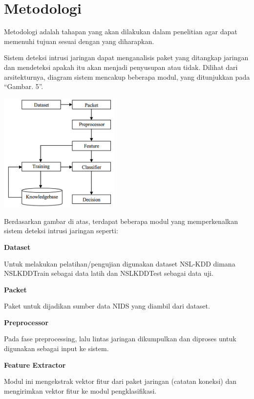 \documentclass[conference]{IEEEtran}
\begin{document}
\section{Metodologi}

Metodologi adalah tahapan yang akan dilakukan dalam penelitian agar dapat memenuhi tujuan sesuai dengan yang diharapkan.

Sistem deteksi intrusi jaringan dapat menganalisis paket yang ditangkap jaringan dan mendeteksi apakah itu akan menjadi penyusupan atau tidak.
Dilihat dari arsitekturnya, diagram sistem mencakup beberapa modul, yang ditunjukkan pada ``Gambar. 5''.

\noindent \begin{minipage}{\linewidth}
\centerline{\includegraphics[width=60mm]{Gambar/Metodologi_Diagram.png}}
\label{fig5}
\end{minipage}
\vspace{6pt}

Berdasarkan gambar di atas, terdapat beberapa modul yang memperkenalkan sistem deteksi intrusi jaringan seperti:

\noindent \textbf{Dataset}

Untuk melakukan pelatihan/pengujian digunakan dataset NSL-KDD dimana NSLKDDTrain sebagai data latih dan NSLKDDTest sebagai data uji.

\noindent \textbf{Packet}

Paket untuk dijadikan sumber data NIDS yang diambil dari dataset.

\noindent \textbf{Preprocessor}

Pada fase preprocessing, lalu lintas jaringan dikumpulkan dan diproses untuk digunakan sebagai input ke sistem.

\noindent \textbf{Feature Extractor}

Modul ini mengekstrak vektor fitur dari paket jaringan (catatan koneksi) dan mengirimkan vektor fitur ke modul pengklasifikasi.
\end{document}
